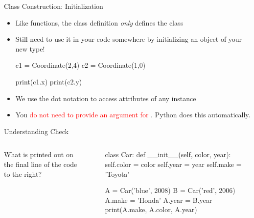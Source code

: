 \documentclass[pdf, aspectratio=169, 12pt]{beamer}
\begin{document}
\begin{frame}[fragile]{Class Construction: Initialization}
	\begin{itemize}
		\item Like functions, the class definition \emph{only} defines the class
		\item Still need to \alert{use} it in your code somewhere by initializing an object of your new type!
			\begin{pythoncode}
				c1 = Coordinate(2,4)
				c2 = Coordinate(1,0)

				print(c1.x)
				print(c2.y)
			\end{pythoncode}
		\item We use the dot notation to access attributes of any instance
		\item You \textcolor{Red}{do not need to provide an argument for }. Python does this automatically.
	\end{itemize}
	
\end{frame}


\begin{frame}[fragile]{Understanding Check}
	\begin{columns}
		What is printed out on the final line of the code to the right?
		\begin{poll}
		\item {}
		\item {}
		\item {}
		\item {}
		\end{poll}
		
		{\small
			\begin{pythoncode}[tabsize=2]
				class Car:
					def __init__(self, color, year):
						self.color = color
						self.year = year
						self.make = 'Toyota'

				A = Car('blue', 2008)
				B = Car('red', 2006)
				A.make = 'Honda'
				A.year = B.year
				print(A.make, A.color, A.year)
			\end{pythoncode}
		}
	\end{columns}
\end{frame}
\end{document}
